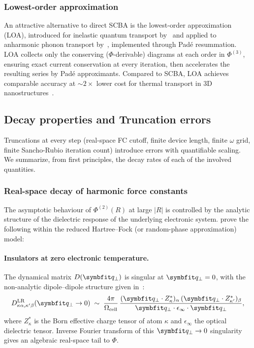 \subsubsection{Lowest-order approximation}

An attractive alternative to direct SCBA is the
lowest-order approximation (LOA), introduced for inelastic quantum transport
by~\citet{mera_inelastic_2012} and applied to anharmonic phonon transport
by~\citet{lee_anharmonic_2018,lee_quantum_2019}, implemented through Padé
resummation. LOA collects only the conserving ($\Phi$-derivable) diagrams
at each order in $\Phi^{(3)}$, ensuring exact current conservation
at every iteration, then accelerates the resulting series by
Padé approximants. Compared to SCBA, LOA achieves comparable accuracy
at $\sim 2\times$ lower cost for thermal transport in 3D
nanostructures~\cite{lee_anharmonic_2018}.

\subsection{Decay properties and Truncation errors}
\label{sub:decay}

Truncations at every step (real-space FC cutoff, finite device length, finite $\omega$ grid,
finite Sancho-Rubio iteration count) introduce errors with
quantifiable scaling. We summarize, from first principles, the decay
rates of each of the involved quantities.

\subsubsection{Real-space decay of harmonic force constants}
\label{subsub:fc2_decay}

The asymptotic behaviour of $\Phi^{(2)}(R)$ at large $|R|$ is controlled
by the analytic structure of the dielectric response of the underlying
electronic system.  prove the following
within the reduced Hartree--Fock (or random-phase
approximation) model:

\paragraph{Insulators at zero electronic temperature.}
The dynamical matrix $D(\qp)$ is singular at $\qp = 0$, with the
non-analytic dipole--dipole structure given in~\cite{cochran_dielectric_1962}:
\begin{equation}\label{eq:fc2_dipole}
  D^{\mathrm{LR}}_{\kappa\alpha,\kappa'\beta}(\qp \to 0)
  \;\sim\;
  \frac{4\pi}{\Omega_{\mathrm{cell}}}\,
  \frac{(\qp\cdot Z^*_{\kappa})_\alpha\,(\qp\cdot Z^*_{\kappa'})_\beta}
       {\qp\cdot \epsilon_\infty\cdot \qp},
\end{equation}
where $Z^*_\kappa$ is the Born effective charge tensor of atom $\kappa$
and $\epsilon_\infty$ the optical dielectric tensor. Inverse Fourier
transform of this $\qp\to 0$ singularity gives an algebraic
real-space tail to $\Phi$.

